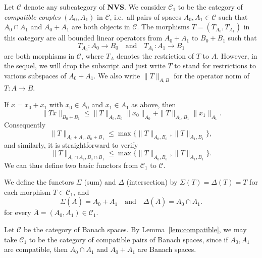 Let $\mathscr{C}$ denote any subcategory of \textbf{NVS}. We consider $\mathscr{C}_1$ to be the category of \emph{compatible couples} $(A_0,A_1)$ in $\mathscr{C}$, i.e.\ all pairs of spaces $A_0,A_1\in\mathscr{C}$ such that $A_0\cap A_1$ and $A_0+A_1$ are both objects in $\mathscr{C}$. The morphisms $T=(T_{A_0},T_{A_1})$ in this category are all bounded linear operators from $A_0+A_1$ to $B_0+B_1$ such that
\begin{equation*}
    T_{A_0}:A_0\to B_0 \quad \text{and} \quad T_{A_1}:A_1\to B_1
\end{equation*}
are both morphisms in $\mathscr{C}$, where $T_A$ denotes the restriction of $T$ to $A$. However, in the sequel, we will drop the subscript and just write $T$ to stand for restrictions to various subspaces of $A_0+A_1$. We also write $\|T\|_{A,B}$ for the operator norm of $T:A\to B$.

If $x=x_0+x_1$ with $x_0\in A_0$ and $x_1\in A_1$ as above, then
\begin{equation*}
    \|Tx\|_{B_0+B_1} \le \|T\|_{A_0,B_0}\|x_0\|_{A_0} + \|T\|_{A_1,B_1}\|x_1\|_{A_1}.
\end{equation*}
Consequently
\begin{equation*}
    \|T\|_{A_0+A_1, B_0+B_1} \le \max\{\|T\|_{A_0,B_0}, \|T\|_{A_1,B_1}\},
\end{equation*}
and similarly, it is straightforward to verify
\begin{equation*}
    \|T\|_{A_0\cap A_1, B_0\cap B_1} \le \max\{\|T\|_{A_0,B_0}, \|T\|_{A_1,B_1}\}.
\end{equation*}
We can thus define two basic functors from $\mathscr{C}_1$ to $\mathscr{C}$.

\begin{definition}
We define the functors $\Sigma$ (sum) and $\Delta$ (intersection) by $\Sigma(T)=\Delta(T)=T$ for each morphism $T\in\mathscr{C}_1$, and
\begin{equation*}
    \Sigma(\bar{A}) = A_0+A_1 \quad \text{and} \quad \Delta(\bar{A})=A_0\cap A_1.
\end{equation*}
for every $\bar{A}=(A_0,A_1)\in\mathscr{C}_1$.
\end{definition}

\begin{example}
Let $\mathscr{C}$ be the category of Banach spaces. By Lemma~\ref{lem:compatible}, we may take $\mathscr{C}_1$ to be the category of compatible pairs of Banach spaces, since if $A_0,A_1$ are compatible, then $A_0\cap A_1$ and $A_0+A_1$ are Banach spaces.
\end{example}

